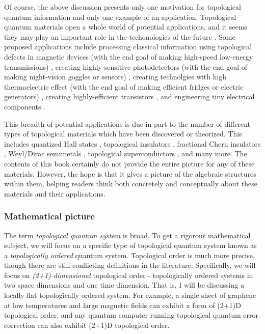 Of course, the above discussion presents only one motivation for topological quantum information and only one example of an application. Topological quantum materials open a whole world of potential applications, and it seems they may play an important role in the techonologies of the future \cite{ramirez2020dawn}. Some proposed applications include processing classical information using topological defects in magnetic devices (with the end goal of making high-speed low-energy transmissions) \cite{marrows2021perspective, vsmejkal2018topological}, creating highly sensitive photodetectors (with the end goal of making night-vision goggles or sensors) \cite{chan2017photocurrents}, creating technolgies with high thermoelectric effect (with the end goal of making efficient fridges or electric generators) \cite{skinner2018large}, creating highly-efficient transistors \cite{fuhrer2021proposal}, and engineering tiny electrical components \cite{viola2014hall, placke2017model}. 

This breadth of potential applications is due in part to the number of different types of topological materials which have been discovered or theorized. This includes quantized Hall states \cite{von202040}, topological insulators \cite{hasan2010colloquium}, fractional Chern insulators \cite{regnault2011fractional}, Weyl/Dirac semimetals \cite{armitage2018weyl}, topological superconductors \cite{sato2017topological}, and many more. The contents of this book certainly do not provide the entire picture for any of these materials. However, the hope is that it gives a picture of the algebraic structures within them, helping readers think both concretely and conceptually about these materials and their applications.

\subsubsection{Mathematical picture}

The term {\em topological quantum system} is broad. To get a rigorous mathematical subject, we will focus on a specific type of topological quantum system known as a {\em topologically ordered} quantum system. Topological order is much more precise, though there are still conflicting definitions in the literature. Specifically, we will focus on {\em (2+1)-dimensional} topological order - topologically ordered systems in two space dimensions and one time dimension. That is, I will be discussing a locally flat topologically ordered system. For example, a single sheet of graphene at low temperatures and large magnetic fields can exhibit a form of (2+1)D topological order, and any quantum computer running topological quantum error correction can also exhibit (2+1)D topological order.

